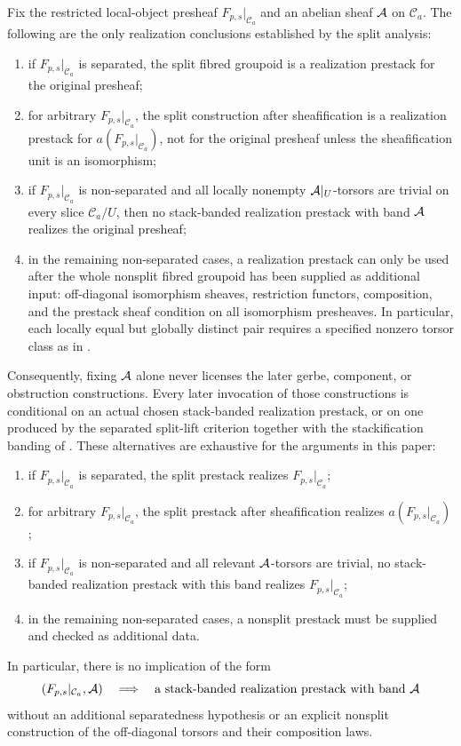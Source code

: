 \begin{proposition}\label{prop:no-band-only-realization-principle}
Fix the restricted local-object presheaf $F_{p,s}|_{\mathcal C_a}$ and an
abelian sheaf $\mathcal{A}$ on $\mathcal C_a$. The following are the only
realization conclusions established by the split analysis:
\begin{enumerate}[label=(\roman*),nosep]
\item if $F_{p,s}|_{\mathcal C_a}$ is separated, the split fibred groupoid is a
realization prestack for the original presheaf;
\item for arbitrary $F_{p,s}|_{\mathcal C_a}$, the split construction after
sheafification is a realization prestack for
$a(F_{p,s}|_{\mathcal C_a})$, not for the original presheaf unless the
sheafification unit is an isomorphism;
\item if $F_{p,s}|_{\mathcal C_a}$ is non-separated and all locally nonempty
$\mathcal{A}|_U$-torsors are trivial on every slice $\mathcal C_a/U$, then no
stack-banded realization prestack with band $\mathcal{A}$ realizes the original
presheaf;
\item in the remaining non-separated cases, a realization prestack can only be
used after the whole nonsplit fibred groupoid has been supplied as additional
input: off-diagonal isomorphism sheaves, restriction functors, composition, and
the prestack sheaf condition on all isomorphism presheaves. In particular, each
locally equal but globally distinct pair requires a specified nonzero torsor
class as in .
\end{enumerate}
Consequently, fixing $\mathcal{A}$ alone never licenses the later gerbe, component,
or obstruction constructions. Every later invocation of those constructions is
conditional on an actual chosen stack-banded realization prestack, or on one
produced by the separated split-lift criterion together with the stackification
banding of . These alternatives are exhaustive for the
arguments in this paper:
\begin{enumerate}[label=(\alph*),nosep]
\item if $F_{p,s}|_{\mathcal C_a}$ is separated, the split prestack realizes
$F_{p,s}|_{\mathcal C_a}$;
\item for arbitrary $F_{p,s}|_{\mathcal C_a}$, the split prestack after
sheafification realizes $a(F_{p,s}|_{\mathcal C_a})$;
\item if $F_{p,s}|_{\mathcal C_a}$ is non-separated and all relevant
$\mathcal{A}$-torsors are trivial, no stack-banded realization prestack with this
band realizes $F_{p,s}|_{\mathcal C_a}$;
\item in the remaining non-separated cases, a nonsplit prestack must be supplied
and checked as additional data.
\end{enumerate}
In particular, there is no implication of the form
\[
(F_{p,s}|_{\mathcal C_a},\mathcal{A})
\quad\Longrightarrow\quad
\text{a stack-banded realization prestack with band }\mathcal{A}
\]
without an additional separatedness hypothesis or an explicit nonsplit
construction of the off-diagonal torsors and their composition laws.
\end{proposition}

